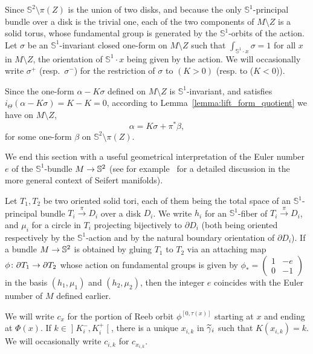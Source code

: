 \documentclass[AHL,Unicode,longabstracts]{cedram}
\newcommand{\bbS}{\mathbb{S}}
\renewcommand*{\to}{\mathchoice{\longrightarrow}{\rightarrow}{\rightarrow}{\rightarrow}}
\let\oldtilde\tilde
\renewcommand*{\tilde}[1]{\mathchoice{\widetilde{#1}}{\widetilde{#1}}{\oldtilde{#1}}{\oldtilde{#1}}}
\newcommand{\bbS}{\mathbb{S}}
\begin{document}
Since $\bbS^2 \setminus \pi(Z)$ is the union of two disks, and because the only $\bbS^1$-principal bundle over a disk is the trivial one, each of the two components of $M \setminus Z$ is a solid torus, whose fundamental group is generated by the $\bbS^1$-orbits of the action. Let $\sigma$ be an $\bbS^1$-invariant closed one-form on $M \setminus Z$ such that $\int_{\bbS^1\cdot x} \sigma = 1$ for all $x$ in $M \setminus Z$, the orientation of $\bbS^1 \cdot x$ being given by the action. We will occasionally write $\sigma ^+$ (resp.~$\sigma^-$) for the restriction of $\sigma$ to $(K>0)$ (resp. to ($K < 0$)).

Since the one-form $\alpha - K \sigma$ defined on $M \setminus Z$ is $\bbS^1$-invariant, and satisfies\linebreak $i_\Theta(\alpha - K \sigma) = K - K = 0$, according to Lemma~\ref{lemma:lift_form_quotient} we have on $M \setminus Z$,
\[
\alpha = K \sigma + \pi^*\beta,
\]
for some one-form $\beta$ on $\bbS^2 \setminus \pi(Z)$.

We end this section with a useful geometrical interpretation of the Euler number~$e$ of the $\bbS^1$-bundle $M \to \bbS^2$ (see for example~\cite{jankins1983lectures} for a detailed discussion in the more general context of Seifert manifolds).

\begin{rema}\label{remark:euler_number}
Let $T_1, T_2$ be two oriented solid tori, each of them being the total space of an $\bbS^1$-principal bundle $T_i \xrightarrow{\pi} D_i$ over a disk $D_i$. We write $h_i$ for an $\bbS^1$-fiber of $T_i \xrightarrow{\pi} D_i$, and $\mu_i$ for a circle in $T_i$ projecting bijectively to $\partial D_i$ (both being oriented respectively by the $\bbS^1$-action and by the natural boundary orientation of $\partial D_i$). If a bundle $M \to \bbS^2$ is obtained by gluing $T_1$ to $T_2$ via an attaching map $\phi \colon \partial T_1 \to \partial T_2$ whose action on fundamental groups is given by $\phi_* =
\left(\begin{smallmatrix}
1 & -e\\0 & -1
\end{smallmatrix}\right)$ in the basis $(h_1, \mu_1)$ and $(h_2, \mu_2)$, then the integer $e$ coincides with the Euler number of $M$ defined earlier.
\end{rema}

We will write $c_x$ for the portion of Reeb orbit $\phi^{[0,\tau(x)]}$ starting at $x$ and ending at $\Phi(x)$. If $k \in\mathopen{]}K^-_i, K^+_i\mathclose{[}$, there is a unique $x_{i,k}$ in $\tilde \gamma_i$ such that $K(x_{i,k}) = k$. We will occasionally write $c_{i,k}$ for $c_{x_{i,k}}$.
\end{document}
